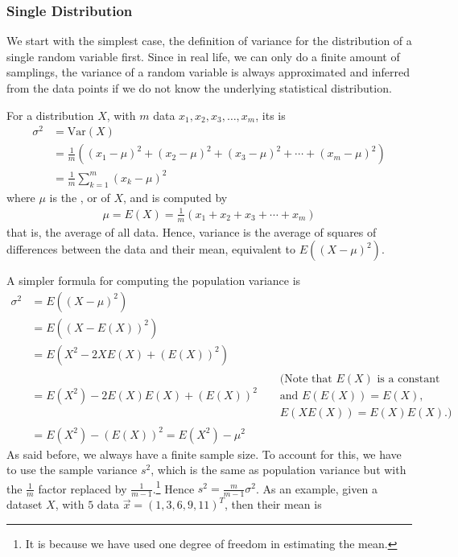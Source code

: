 \subsubsection{Single Distribution}
We start with the simplest case, the definition of variance for the distribution of a single random variable first. Since in real life, we can only do a finite amount of samplings, the variance of a random variable is always approximated and inferred from the data points if we do not know the underlying statistical distribution.
\begin{defn}
\label{defn:variance}
For a distribution $X$, with $m$ data $x_1, x_2, x_3, \ldots, x_m$, its  is
\begin{subequations}
\label{eqn:variance}
\begin{align}
\sigma^2 &= \text{Var}(X) \nonumber\\
&= \frac{1}{m} ((x_1 - \mu)^2 + (x_2 - \mu)^2 + (x_3 - \mu)^2 + \cdots + (x_m - \mu)^2) \\
&= \frac{1}{m} \sum_{k=1}^m (x_k - \mu)^2 \label{eqn:varianceb}
\end{align}    
\end{subequations}
where $\mu$ is the , or  of $X$, and is computed by
\begin{align}
\mu = E(X) = \frac{1}{m} (x_1 + x_2 + x_3 + \cdots + x_m)
\end{align}
that is, the average of all data. Hence, variance is the average of squares of differences between the data and their mean, equivalent to $E((X-\mu)^2)$.
\end{defn}
A simpler formula for computing the population variance is
\begin{align}
\sigma^2 &= E((X-\mu)^2) \nonumber \\
&= E((X-E(X))^2) \nonumber \\
&= E(X^2-2XE(X)+(E(X))^2) \nonumber \\
&= E(X^2) - 2E(X)E(X) + (E(X))^2 \nonumber & \begin{aligned} &\text{(Note that $E(X)$ is a constant}\\ &\text{and $E(E(X)) = E(X)$,} \\
&\text{$E(XE(X)) = E(X)E(X)$.)}\end{aligned} \\
&= E(X^2) - (E(X))^2 = E(X^2) - \mu^2 \label{eqn:varshortcut}
\end{align}
As said before, we always have a finite sample size. To account for this, we have to use the sample variance $s^2$, which is the same as population variance but with the $\frac{1}{m}$ factor replaced by $\frac{1}{m-1}$.\footnote{It is because we have used one degree of freedom in estimating the mean.} Hence $s^2 = \frac{m}{m-1}\sigma^2$. As an example, given a dataset $X$, with $5$ data $\vec{x} = (1, 3, 6, 9, 11)^T$, then their mean is
